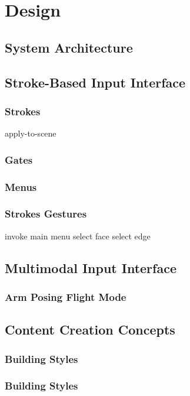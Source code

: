 \chapter{Design}


\section{System Architecture}



\section{Stroke-Based Input Interface}

\subsection{Strokes}

apply-to-scene

\subsection{Gates}

\subsection{Menus}

\subsection{Strokes Gestures}

invoke main menu
select face
select edge

\section{Multimodal Input Interface}

\subsection{Arm Posing Flight Mode}


\section{Content Creation Concepts}

\subsection{Building Styles}

\subsection{Building Styles}